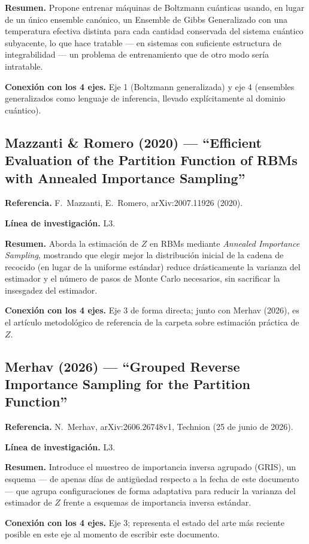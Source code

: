 \documentclass[12pt]{article}
\begin{document}
\textbf{Resumen.} Propone entrenar máquinas de Boltzmann cuánticas usando, en lugar de un único ensemble canónico, un Ensemble de Gibbs Generalizado con una temperatura efectiva distinta para cada cantidad conservada del sistema cuántico subyacente, lo que hace tratable --- en sistemas con suficiente estructura de integrabilidad --- un problema de entrenamiento que de otro modo sería intratable.

\textbf{Conexión con los 4 ejes.} Eje 1 (Boltzmann generalizada) y eje 4 (ensembles generalizados como lenguaje de inferencia, llevado explícitamente al dominio cuántico).

\subsection{Mazzanti \& Romero (2020) --- ``Efficient Evaluation of the Partition Function of RBMs with Annealed Importance Sampling''}
\textbf{Referencia.} F.~Mazzanti, E.~Romero, arXiv:2007.11926 (2020). \cite{mazzanti2020}

\textbf{Línea de investigación.} L3.

\textbf{Resumen.} Aborda la estimación de $Z$ en RBMs mediante \emph{Annealed Importance Sampling}, mostrando que elegir mejor la distribución inicial de la cadena de recocido (en lugar de la uniforme estándar) reduce drásticamente la varianza del estimador y el número de pasos de Monte Carlo necesarios, sin sacrificar la insesgadez del estimador.

\textbf{Conexión con los 4 ejes.} Eje 3 de forma directa; junto con Merhav (2026), es el artículo metodológico de referencia de la carpeta sobre estimación práctica de $Z$.

\subsection{Merhav (2026) --- ``Grouped Reverse Importance Sampling for the Partition Function''}
\textbf{Referencia.} N.~Merhav, arXiv:2606.26748v1, Technion (25 de junio de 2026). \cite{merhav2026}

\textbf{Línea de investigación.} L3.

\textbf{Resumen.} Introduce el muestreo de importancia inversa agrupado (GRIS), un esquema --- de apenas días de antigüedad respecto a la fecha de este documento --- que agrupa configuraciones de forma adaptativa para reducir la varianza del estimador de $Z$ frente a esquemas de importancia inversa estándar.

\textbf{Conexión con los 4 ejes.} Eje 3; representa el estado del arte más reciente posible en este eje al momento de escribir este documento.
\end{document}
